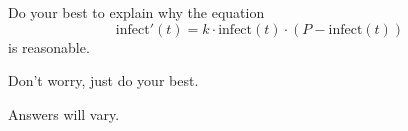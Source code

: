 \documentclass{ximera}
\begin{document}
\begin{problem}
  Do your best to explain why the equation
  \[
  \mathrm{infect}'(t) = k\cdot \mathrm{infect}(t)\cdot (P-\mathrm{infect}(t))
  \]
  is reasonable.
  \begin{hint}
    Don't worry, just do your best.
  \end{hint}
  \begin{freeResponse}
    Answers will vary.
  \end{freeResponse}
\end{problem}


\end{document}
